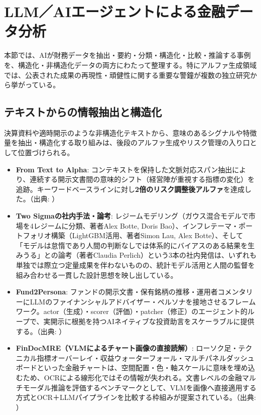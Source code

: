 \section{LLM／AIエージェントによる金融データ分析}
\label{sec:llm-analysis}

本節では、AIが財務データを抽出・要約・分類・構造化・比較・推論する事例を、構造化・非構造化データの両方にわたって整理する。特にアルファ生成領域では、公表された成果の再現性・頑健性に関する重要な警鐘が複数の独立研究から挙がっている。

\subsection{テキストからの情報抽出と構造化}

決算資料や適時開示のような非構造化テキストから、意味のあるシグナルや特徴量を抽出・構造化する取り組みは、後段のアルファ生成やリスク管理の入り口として位置づけられる。

\begin{itemize}
  \item \textbf{From Text to Alpha}: コンテキストを保持した文脈対応スパン抽出により、連続する開示文書間の意味的シフト（経営陣が重視する指標の変化）を追跡。キーワードベースラインに対し\textbf{2倍のリスク調整後アルファ}を達成した。（出典: \cite{texttoalpha2025}）
  \item \textbf{Two Sigmaの社内手法・論考}: レジームモデリング（ガウス混合モデルで市場を4レジームに分類、著者Alex Botte, Doris Bao）\cite{twosigmandregimemodeling}、インフレテーマ・ポートフォリオ構築（LightGBM活用、著者Simon Lau, Alex Botte）\cite{twosigmandinflationportfolio}、そして「モデルは怠惰であり人間の判断なしでは体系的にバイアスのある結果を生みうる」との論考（著者Claudia Perlich）\cite{twosigmandintuition}という3本の社内発信は、いずれも単独では際立つ定量成果を伴わないものの、統計モデル活用と人間の監督を組み合わせる一貫した設計思想を映し出している。
  \item \textbf{Fund2Persona}: ファンドの開示文書・保有銘柄の推移・運用者コメンタリーにLLMのファイナンシャルアドバイザー・ペルソナを接地させるフレームワーク。actor（生成）・scorer（評価）・patcher（修正）のエージェント的ループで、実開示に根拠を持つAIネイティブな投資助言をスケーラブルに提供する。（出典: \cite{fund2persona2026}）
  \item \textbf{FinDocMRE（VLMによるチャート画像の直接読解）}: ローソク足・テクニカル指標オーバーレイ・収益ウォーターフォール・マルチパネルダッシュボードといった金融チャートは、空間配置・色・軸スケールに意味を埋め込むため、OCRによる線形化ではその情報が失われる。文書レベルの金融マルチモーダル推論を評価するベンチマークとして、VLMを画像へ直接適用する方式とOCR＋LLMパイプラインを比較する枠組みが提案されている。（出典: \cite{findocmre2026}）
\end{itemize}

